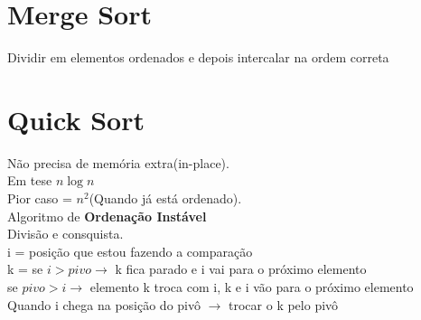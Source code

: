 \documentclass[•]{article}
\begin{document}
	\section{Merge Sort}	
		\begin{center}
			Dividir em elementos ordenados  e depois intercalar na ordem correta
		\end{center}
	\section{Quick Sort}
		Não precisa de memória extra(in-place).\\
		Em tese $n \log n$\\
		Pior caso = $n^2$(Quando já está ordenado).\\
		Algoritmo de \textbf{Ordenação Instável}\\
		Divisão e consquista.\\
		i = posição que estou fazendo a comparação\\
		k = 
		se $i>pivo \to$ k fica parado e i vai para o próximo elemento\\
		se $pivo>i \to$ elemento k troca com i, k e i vão para o próximo elemento\\
		Quando i chega na posição do pivô $\to$ trocar o k pelo pivô
\end{document}
